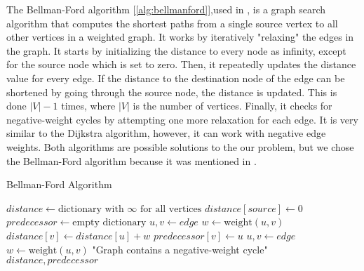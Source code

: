 The Bellman-Ford algorithm [\ref{alg:bellmanford}],used in \texttt{}, 
is a graph search algorithm that computes 
the shortest paths from a single source vertex to all other vertices in a weighted graph.
It works by iteratively "relaxing" the edges in the graph. 
It starts by initializing the distance to every node as infinity, except for the source node which is set to zero. 
Then, it repeatedly updates the distance value for every edge. 
If the distance to the destination node of the edge can be shortened by going through the source node, the distance is updated. 
This is done $|V|-1$ times, where $|V|$ is the number of vertices. 
Finally, it checks for negative-weight cycles by attempting one more relaxation for each edge.
It is very similar to the Dijkstra algorithm, however, it can work with negative edge weights.
Both algorithms are possible solutions to the our problem, but we chose the Bellman-Ford algorithm because it was mentioned in \cite{threat_surf}.

\begin{algorithm}[h]
    \caption{Bellman-Ford Algorithm}
    \label{alg:bellmanford}
    \begin{algorithmic}[1]
        \State $distance \gets \text{dictionary with } \infty \text{ for all vertices}$
        \State $distance[source] \gets 0$
        \State $predecessor \gets \text{empty dictionary}$
                \State $u, v \gets edge$
                \State $w \gets \text{weight}(u, v)$
                    \State $distance[v] \gets distance[u] + w$
                    \State $predecessor[v] \gets u$
                \EndIf
            \EndFor
        \EndFor
            \State $u, v \gets edge$
            \State $w \gets \text{weight}(u, v)$
                \State \Return "Graph contains a negative-weight cycle"
            \EndIf
        \EndFor
        \State \Return $distance, predecessor$
    \EndProcedure
    \end{algorithmic}
\end{algorithm}